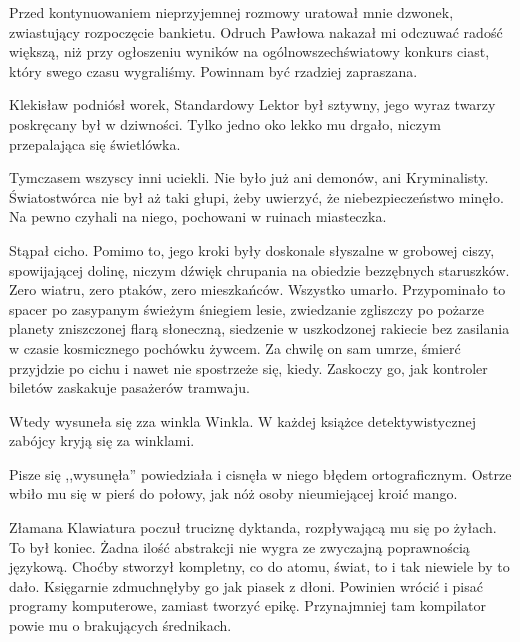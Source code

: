 Przed kontynuowaniem nieprzyjemnej rozmowy uratował mnie dzwonek, zwiastujący rozpoczęcie bankietu.
Odruch Pawłowa nakazał mi odczuwać radość większą, niż przy ogłoszeniu wyników na ogólnowszechświatowy konkurs ciast, który swego czasu wygraliśmy. 
Powinnam być rzadziej zapraszana.

\divider{}

Klekisław podniósł worek, Standardowy Lektor był sztywny, jego wyraz twarzy poskręcany był w dziwności. 
Tylko jedno oko lekko mu drgało, niczym przepalająca się świetlówka.

Tymczasem wszyscy inni uciekli. Nie było już ani demonów, ani Kryminalisty. Światostwórca nie był aż taki głupi, żeby uwierzyć, że niebezpieczeństwo minęło. 
Na pewno czyhali na niego, pochowani w ruinach miasteczka.

Stąpał cicho. Pomimo to, jego kroki były doskonale słyszalne w grobowej ciszy, spowijającej dolinę, niczym dźwięk chrupania na obiedzie bezzębnych staruszków.
Zero wiatru, zero ptaków, zero mieszkańców. Wszystko umarło. 
Przypominało to spacer po zasypanym świeżym śniegiem lesie, 
zwiedzanie zgliszczy po pożarze planety zniszczonej flarą słoneczną, 
siedzenie w uszkodzonej rakiecie bez zasilania w czasie kosmicznego pochówku żywcem.
Za chwilę on sam umrze, śmierć przyjdzie po cichu i nawet nie spostrzeże się, kiedy.
Zaskoczy go, jak kontroler biletów zaskakuje pasażerów tramwaju.

Wtedy wysuneła się zza winkla Winkla. 
W każdej książce detektywistycznej zabójcy kryją się za winklami.

\begin{dialogue}
\ds{} Pisze się ,,wysunęła'' \dm{} powiedziała i cisnęła w niego błędem ortograficznym. Ostrze wbiło mu się w pierś do połowy, jak nóż osoby nieumiejącej kroić mango.
\end{dialogue}
Złamana Klawiatura poczuł truciznę dyktanda, rozpływającą mu się po żyłach. To był koniec. Żadna ilość abstrakcji nie wygra ze zwyczajną poprawnością językową.
Choćby stworzył kompletny, co do atomu, świat, to i tak niewiele by to dało. Księgarnie zdmuchnęłyby go jak piasek z dłoni.
Powinien wrócić i pisać programy komputerowe, zamiast tworzyć epikę. Przynajmniej tam kompilator powie mu o brakujących średnikach.

